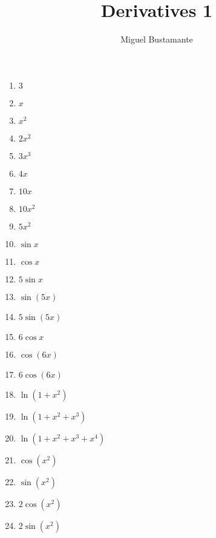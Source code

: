 \documentclass{article}
\title{Derivatives 1}
\author{Miguel Bustamante}
\begin{document}
\begin{multicols}{3}
\begin{enumerate}
    \item $3$
    \item $x$
    \item $x^2$
    \item $2x^2$
    \item $3x^3$
    \item $4x$
    \item $10x$
    \item $10x^2$
    \item $5x^2$
    \item $\sin x$
    \item $\cos x$
    \item $5\sin x$
    \item $\sin(5x)$
    \item $5\sin(5x)$
    \item $6\cos x$
    \item $\cos(6x)$
    \item $6\cos(6x)$
    \item $\ln(1+x^2)$
    \item $\ln(1+x^2+x^3)$
    \item $\ln(1+x^2+x^3+x^4)$
    \item $\cos(x^2)$
    \item $\sin(x^2)$
    \item $2\cos(x^2)$
    \item $2\sin(x^2)$
\end{enumerate}
\end{multicols}
\end{document}
